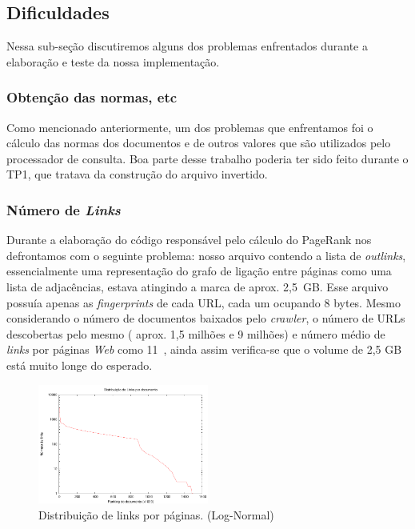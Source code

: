 \documentclass[10pt,twocolumn]{article}
\begin{document}
\subsection{Dificuldades}

Nessa sub-seção discutiremos alguns dos problemas enfrentados durante a
elaboração e teste da nossa implementação.

\subsubsection{Obtenção das normas, etc}

Como mencionado anteriormente, um dos problemas que enfrentamos foi o
cálculo das normas dos documentos e de outros valores que são utilizados
pelo processador de consulta. Boa parte desse trabalho poderia ter sido
feito durante o TP1, que tratava da construção do arquivo invertido.

\subsubsection{Número de \emph{Links}}

Durante a elaboração do código responsável pelo cálculo do PageRank nos
defrontamos com o seguinte problema: nosso arquivo contendo a lista de
\emph{outlinks}, essencialmente uma representação do grafo de ligação
entre páginas como uma lista de adjacências, estava atingindo a marca de
aprox. 2,5~GB. Esse arquivo possuía apenas as \emph{fingerprints} de
cada URL, cada um ocupando 8 bytes. Mesmo considerando o
número de documentos baixados pelo \emph{crawler}, o número de
URLs descobertas pelo mesmo ( aprox. 1,5 milhões e 9 milhões) e número
médio de \emph{links} por páginas \emph{Web} como 11~\cite{page98pagerank}, ainda
assim verifica-se que o volume de 2,5 GB está muito longe do esperado.


\begin{figure}[ht]
\begin{center}
\includegraphics[width=0.5\textwidth]{plot_linkranking}
\end{center}
\caption{Distribuição de links por páginas. (Log-Normal)}
\label{fig:linkspp}
\end{figure}
\end{document}
